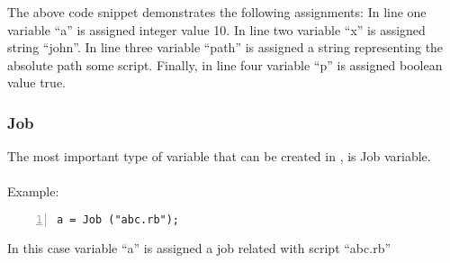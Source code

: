 The above code snippet demonstrates the following assignments:
In line one variable ``a'' is assigned integer value 10.
In line two variable ``x'' is assigned string ``john''.
In line three variable ``path'' is assigned a string representing the absolute path some script.
Finally, in line four variable ``p'' is assigned boolean value true.

\subsubsection*{Job}
The most important type of variable that can be created in \lang{}, is Job variable.\\
\\
Example:
\begin{Verbatim}[numbers=left]
a = Job ("abc.rb");
\end{Verbatim}
In this case variable ``a'' is assigned a job related with script ``abc.rb'' 

